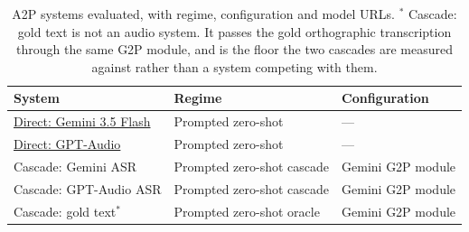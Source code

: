 \begin{table}[t]
\centering
\small
\begin{tabular}{l l l}
\toprule
\textbf{System} & \textbf{Regime} & \textbf{Configuration} \\
\midrule
\href{https://ai.google.dev/gemini-api/docs/models}{Direct: Gemini 3.5 Flash} & Prompted zero-shot & --- \\
\href{https://platform.openai.com/docs/guides/audio}{Direct: GPT-Audio} & Prompted zero-shot & --- \\
Cascade: Gemini ASR & Prompted zero-shot cascade & Gemini G2P module \\
Cascade: GPT-Audio ASR & Prompted zero-shot cascade & Gemini G2P module \\
Cascade: gold text$^{*}$ & Prompted zero-shot oracle & Gemini G2P module \\
\bottomrule
\end{tabular}
\caption{A2P systems evaluated, with regime, configuration and model URLs. $^{*}$ Cascade: gold text is not an audio system. It passes the gold orthographic transcription through the same G2P module, and is the floor the two cascades are measured against rather than a system competing with them.}
\label{tab:a2p-models}
\end{table}
